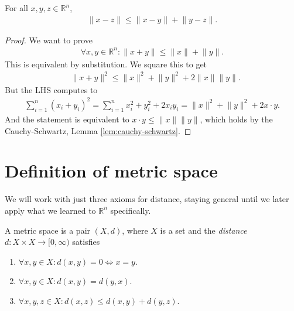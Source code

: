 \begin{lemma}\label{lem:triangle_ineq}
	For all $x, y, z \in \mathbb{R}^{n}$,
	\begin{align*}
		\lVert  x - z \rVert \leq \lVert x - y \rVert + \lVert y - z \rVert.
	\end{align*}
\end{lemma}
\begin{proof}
	We want to prove
	\begin{align*}
		\forall x, y \in \mathbb{R}^{n}: \lVert x + y \rVert \leq \lVert x \rVert + \lVert y \rVert.
	\end{align*}
	This is equivalent by substitution. We square this to get
	\begin{align*}
		 & \lVert x + y \rVert^{2} \leq \lVert x \rVert^{2} + \lVert y \rVert^{2} + 2 \lVert x \rVert \lVert y \rVert.
	\end{align*}
	But the LHS computes to
	\begin{align*}
		\sum_{i=1}^{n} (x_{i} + y_{i})^{2} = \sum_{i=1}^{n} x_{i}^{2} + y_{i}^{2} + 2x_{i}y_{i} = \lVert x \rVert^{2} + \lVert y \rVert^{2} + 2 x\cdot y.
	\end{align*}
	And the statement is equivalent to $x \cdot y \leq\lVert x \rVert \lVert y \rVert$, which holds by the Cauchy-Schwartz, Lemma \ref{lem:cauchy-schwartz}.
\end{proof}

\section{Definition of metric space}
We will work with just three axioms for distance, staying general until we later apply what we learned to $\mathbb{R}^{n}$ specifically.

\begin{definition}\label{def:metric-space}
	A metric space is a pair $(X,d)$, where $X$ is a set and the \textit{distance} $d: X \times X \to [0, \infty)$ satisfies
	\begin{enumerate}
		\item $\forall x,y \in X: d(x,y) = 0 \iff x = y$.
		\item $\forall x,y \in X: d(x,y) = d(y,x)$.
		\item $\forall x,y,z \in X: d(x,z) \leq d(x,y) + d(y,z)$.
	\end{enumerate}
\end{definition}

